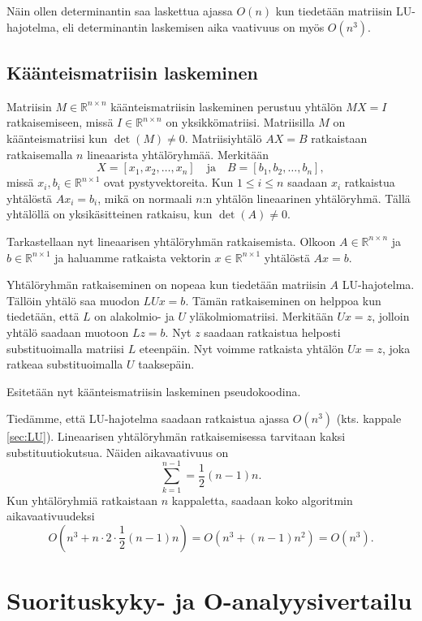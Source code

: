 \documentclass[10pt,a4paper,titlepage]{article}
\newcommand{\R}{\ensuremath{\mathbb{R}}}
\newcommand{\pseudo}[1]{{\small}}
\begin{document}
Näin ollen determinantin saa laskettua ajassa $O(n)$ kun tiedetään matriisin LU-hajotelma, eli determinantin laskemisen
aika vaativuus on myös $O\left(n^3\right)$.


\subsection{Käänteismatriisin laskeminen}

Matriisin $M\in\R^{n\times n}$ käänteismatriisin laskeminen perustuu yhtälön $MX = I$ ratkaisemiseen, missä $I\in\R^{n\times n}$
on yksikkömatriisi. Matriisilla $M$ on käänteismatriisi kun $\det(M) \neq 0$.
Matriisiyhtälö $AX = B$ ratkaistaan ratkaisemalla $n$ lineaarista yhtälöryhmää. Merkitään 
$$
X = [x_1, x_2, \ldots, x_n] \quad \text{ja} \quad B = [b_1, b_2, \ldots, b_n],
$$
missä $x_i,b_i\in\R^{n\times 1}$ ovat pystyvektoreita. Kun $1 \leq i \leq n$ saadaan $x_i$ ratkaistua yhtälöstä $Ax_i = b_i$, mikä on normaali
$n$:n yhtälön lineaarinen yhtälöryhmä. Tällä yhtälöllä on yksikäsitteinen ratkaisu, kun $\det(A) \neq 0$.

Tarkastellaan nyt lineaarisen yhtälöryhmän ratkaisemista. Olkoon $A\in\R^{n\times n}$ ja $b\in\R^{n\times 1}$ ja haluamme ratkaista
vektorin $x\in\R^{n\times 1}$ yhtälöstä $Ax = b$.

Yhtälöryhmän ratkaiseminen on nopeaa kun tiedetään matriisin $A$ LU-hajotelma. Tällöin yhtälö saa muodon 
$LUx = b$. Tämän ratkaiseminen on helppoa kun tiedetään, että $L$ on alakolmio- ja $U$ yläkolmiomatriisi.
Merkitään $Ux = z$, jolloin yhtälö saadaan muotoon $Lz = b$. Nyt $z$ saadaan ratkaistua helposti substituoimalla matriisi
$L$ eteenpäin. Nyt voimme ratkaista yhtälön $Ux = z$, joka ratkeaa substituoimalla $U$ taaksepäin.

Esitetään nyt käänteismatriisin laskeminen pseudokoodina.

\pseudo{inv}

Tiedämme, että LU-hajotelma saadaan ratkaistua ajassa $O\left(n^3\right)$ (kts. kappale \ref{sec:LU}).
Lineaarisen yhtälöryhmän ratkaisemisessa tarvitaan kaksi substituutiokutsua. Näiden aikavaativuus on
$$
\sum_{k=1}^{n-1} = \frac{1}{2}(n-1)n.
$$
Kun yhtälöryhmiä ratkaistaan $n$ kappaletta, saadaan koko algoritmin aikavaativuudeksi
$$
O\left( n^3 + n\cdot2\cdot\frac{1}{2}(n-1)n \right) = O\left( n^3 + (n-1)n^2 \right) = O\left(n^3\right).
$$


\section{Suorituskyky- ja O-analyysivertailu}
\label{sec:vertailu}
\end{document}

